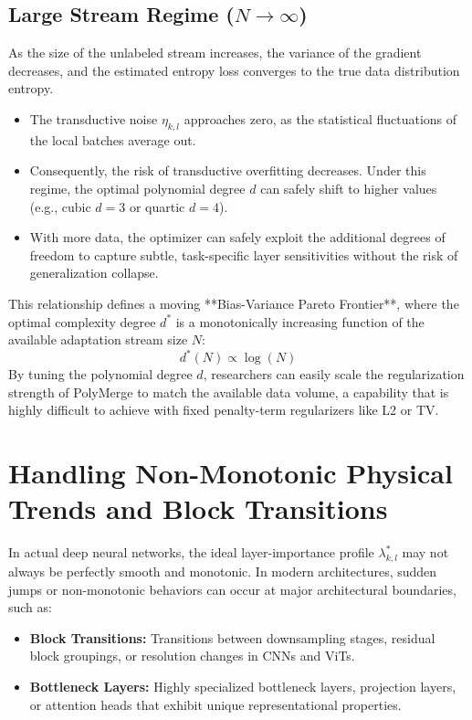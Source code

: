 \subsection{Large Stream Regime ($N \to \infty$)}
As the size of the unlabeled stream increases, the variance of the gradient decreases, and the estimated entropy loss converges to the true data distribution entropy.
\begin{itemize}
    \item The transductive noise $\eta_{k, l}$ approaches zero, as the statistical fluctuations of the local batches average out.
    \item Consequently, the risk of transductive overfitting decreases. Under this regime, the optimal polynomial degree $d$ can safely shift to higher values (e.g., cubic $d=3$ or quartic $d=4$). 
    \item With more data, the optimizer can safely exploit the additional degrees of freedom to capture subtle, task-specific layer sensitivities without the risk of generalization collapse.
\end{itemize}

This relationship defines a moving **Bias-Variance Pareto Frontier**, where the optimal complexity degree $d^*$ is a monotonically increasing function of the available adaptation stream size $N$:
\begin{equation}
d^*(N) \propto \log(N)
\end{equation}
By tuning the polynomial degree $d$, researchers can easily scale the regularization strength of PolyMerge to match the available data volume, a capability that is highly difficult to achieve with fixed penalty-term regularizers like L2 or TV.


\section{Handling Non-Monotonic Physical Trends and Block Transitions}
\label{sec:appendix_nonmonotonic}

In actual deep neural networks, the ideal layer-importance profile $\lambda^*_{k, l}$ may not always be perfectly smooth and monotonic. In modern architectures, sudden jumps or non-monotonic behaviors can occur at major architectural boundaries, such as:
\begin{itemize}
    \item \textbf{Block Transitions:} Transitions between downsampling stages, residual block groupings, or resolution changes in CNNs and ViTs.
    \item \textbf{Bottleneck Layers:} Highly specialized bottleneck layers, projection layers, or attention heads that exhibit unique representational properties.
\end{itemize}

